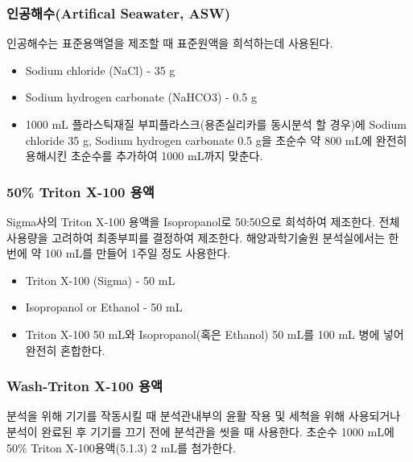 \documentclass[
]{book}
\providecommand{\tightlist}{%
  \setlength{\itemsep}{0pt}\setlength{\parskip}{0pt}}
\begin{document}
\hypertarget{uxc778uxacf5uxd574uxc218artifical-seawater-asw}{%
\subsubsection{인공해수(Artifical Seawater, ASW)}\label{uxc778uxacf5uxd574uxc218artifical-seawater-asw}}

인공해수는 표준용액열을 제조할 때 표준원액을 희석하는데 사용된다.

\begin{itemize}
\tightlist
\item
  Sodium chloride (NaCl) - 35 g\\
\item
  Sodium hydrogen carbonate (NaHCO3) - 0.5 g\\
\item
  1000 mL 플라스틱재질 부피플라스크(용존실리카를 동시분석 할 경우)에 Sodium chloride 35 g, Sodium hydrogen carbonate 0.5 g을 초순수 약 800 mL에 완전히 용해시킨 초순수를 추가하여 1000 mL까지 맞춘다.
\end{itemize}

\hypertarget{triton-x-100-uxc6a9uxc561}{%
\subsubsection{50\% Triton X-100 용액}\label{triton-x-100-uxc6a9uxc561}}

Sigma사의 Triton X-100 용액을 Isopropanol로 50:50으로 희석하여 제조한다. 전체 사용량을 고려하여 최종부피를 결정하여 제조한다. 해양과학기술원 분석실에서는 한 번에 약 100 mL를 만들어 1주일 정도 사용한다.

\begin{itemize}
\tightlist
\item
  Triton X-100 (Sigma) - 50 mL
\item
  Isopropanol or Ethanol - 50 mL
\item
  Triton X-100 50 mL와 Isopropanol(혹은 Ethanol) 50 mL를 100 mL 병에 넣어 완전히 혼합한다.
\end{itemize}

\hypertarget{wash-triton-x-100-uxc6a9uxc561}{%
\subsubsection{Wash-Triton X-100 용액}\label{wash-triton-x-100-uxc6a9uxc561}}

분석을 위해 기기를 작동시킬 때 분석관내부의 윤활 작용 및 세척을 위해 사용되거나 분석이 완료된 후 기기를 끄기 전에 분석관을 씻을 때 사용한다. 초순수 1000 mL에 50\% Triton X-100용액(5.1.3) 2 mL를 첨가한다.
\end{document}

